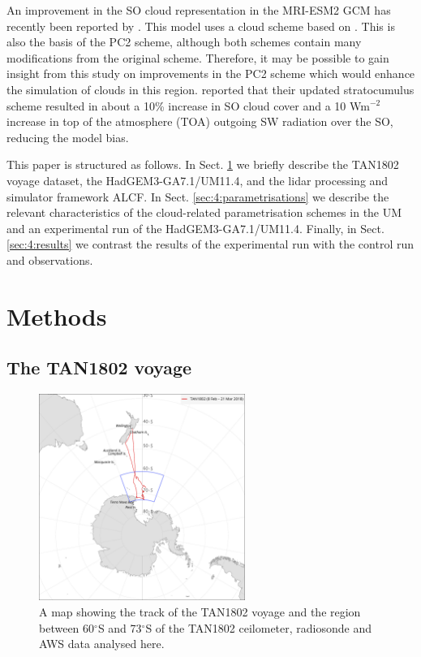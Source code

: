 An improvement in the SO cloud representation in the MRI-ESM2 GCM has recently been
reported by \cite{kawai2019}. This model uses a cloud scheme based on
\cite{tiedtke1993}. This is also the basis of the PC2 scheme, although both
schemes contain many modifications from the original scheme. Therefore, it may be
possible to gain insight from this study on improvements in the PC2 scheme which would enhance the simulation of clouds in this region. \cite{kawai2019} reported that their updated stratocumulus scheme resulted in about
a 10\% increase in SO cloud cover and a 10 Wm$^{-2}$ increase in top of the atmosphere
(TOA) outgoing SW radiation over the SO, reducing the model bias.

This paper is structured as follows.
In Sect. \ref{sec:4:methods} we briefly describe the TAN1802 voyage dataset,
the HadGEM3-GA7.1/UM11.4, and the lidar processing and simulator framework ALCF.
In Sect. \ref{sec:4:parametrisations} we describe the
relevant characteristics of the cloud-related parametrisation schemes in the UM
and an experimental run of the HadGEM3-GA7.1/UM11.4. Finally, in Sect.
\ref{sec:4:results} we contrast the results
of the experimental run with the control run and observations.

\section{Methods}
\label{sec:4:methods}

\subsection{The TAN1802 voyage}

\begin{figure}[t]
\centering
\includegraphics[width=0.6\textwidth]{chapter4/fig/map.pdf}
\caption[A map showing the track of the TAN1802 voyage]{A map showing the track of the TAN1802 voyage and the region
between 60$^\circ$S and 73$^\circ$S of the TAN1802 ceilometer, radiosonde
and AWS data analysed here.
}
\label{fig:4:map}
\end{figure}


